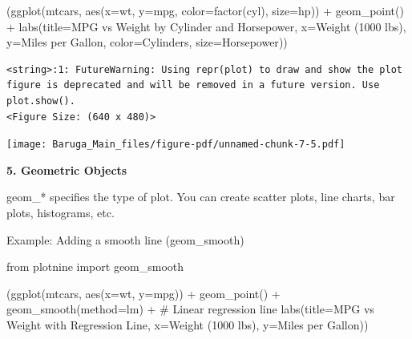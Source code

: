 \documentclass[
  letterpaper,
  DIV=11,
  numbers=noendperiod]{scrreprt}
\newenvironment{Shaded}{\begin{snugshade}}{\end{snugshade}}
\newcommand{\CommentTok}[1]{\textcolor[rgb]{0.37,0.37,0.37}{#1}}
\newcommand{\ImportTok}[1]{\textcolor[rgb]{0.00,0.46,0.62}{#1}}
\newcommand{\NormalTok}[1]{\textcolor[rgb]{0.00,0.23,0.31}{#1}}
\newcommand{\OperatorTok}[1]{\textcolor[rgb]{0.37,0.37,0.37}{#1}}
\newcommand{\StringTok}[1]{\textcolor[rgb]{0.13,0.47,0.30}{#1}}
\begin{document}
\begin{Shaded}
\begin{Highlighting}[]
\NormalTok{(ggplot(mtcars, aes(x}\OperatorTok{=}\StringTok{\textquotesingle{}wt\textquotesingle{}}\NormalTok{, y}\OperatorTok{=}\StringTok{\textquotesingle{}mpg\textquotesingle{}}\NormalTok{, color}\OperatorTok{=}\StringTok{\textquotesingle{}factor(cyl)\textquotesingle{}}\NormalTok{, size}\OperatorTok{=}\StringTok{\textquotesingle{}hp\textquotesingle{}}\NormalTok{)) }\OperatorTok{+}
\NormalTok{ geom\_point() }\OperatorTok{+}
\NormalTok{ labs(title}\OperatorTok{=}\StringTok{\textquotesingle{}MPG vs Weight by Cylinder and Horsepower\textquotesingle{}}\NormalTok{,}
\NormalTok{      x}\OperatorTok{=}\StringTok{\textquotesingle{}Weight (1000 lbs)\textquotesingle{}}\NormalTok{,}
\NormalTok{      y}\OperatorTok{=}\StringTok{\textquotesingle{}Miles per Gallon\textquotesingle{}}\NormalTok{,}
\NormalTok{      color}\OperatorTok{=}\StringTok{\textquotesingle{}Cylinders\textquotesingle{}}\NormalTok{,}
\NormalTok{      size}\OperatorTok{=}\StringTok{\textquotesingle{}Horsepower\textquotesingle{}}\NormalTok{))}
\end{Highlighting}
\end{Shaded}

\begin{verbatim}
<string>:1: FutureWarning: Using repr(plot) to draw and show the plot figure is deprecated and will be removed in a future version. Use plot.show().
<Figure Size: (640 x 480)>
\end{verbatim}

\texttt{[image: Baruga\_Main\_files/figure-pdf/unnamed-chunk-7-5.pdf]}

\textbf{5. Geometric Objects}

geom\_* specifies the type of plot. You can create scatter plots, line
charts, bar plots, histograms, etc.

Example: Adding a smooth line (geom\_smooth)

\begin{Shaded}
\begin{Highlighting}[]
\ImportTok{from}\NormalTok{ plotnine }\ImportTok{import}\NormalTok{ geom\_smooth}

\NormalTok{(ggplot(mtcars, aes(x}\OperatorTok{=}\StringTok{\textquotesingle{}wt\textquotesingle{}}\NormalTok{, y}\OperatorTok{=}\StringTok{\textquotesingle{}mpg\textquotesingle{}}\NormalTok{)) }\OperatorTok{+}
\NormalTok{ geom\_point() }\OperatorTok{+}
\NormalTok{ geom\_smooth(method}\OperatorTok{=}\StringTok{\textquotesingle{}lm\textquotesingle{}}\NormalTok{) }\OperatorTok{+}  \CommentTok{\# Linear regression line}
\NormalTok{ labs(title}\OperatorTok{=}\StringTok{\textquotesingle{}MPG vs Weight with Regression Line\textquotesingle{}}\NormalTok{,}
\NormalTok{      x}\OperatorTok{=}\StringTok{\textquotesingle{}Weight (1000 lbs)\textquotesingle{}}\NormalTok{,}
\NormalTok{      y}\OperatorTok{=}\StringTok{\textquotesingle{}Miles per Gallon\textquotesingle{}}\NormalTok{))}
\end{Highlighting}
\end{Shaded}
\end{document}
